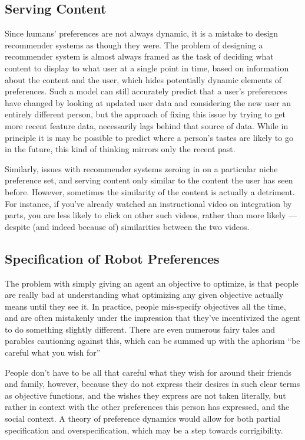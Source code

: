 \documentclass{article}
\begin{document}
	
	\subsection{Serving Content}
	Since humans' preferences are not always dynamic, it is a mistake to design recommender systems as though they were. The problem of designing a recommender system is almost always framed as the task of deciding what content to display to what user at a single point in time, based on information about the content and the user, which hides potentially dynamic elements of preferences. Such a model can still accurately predict that a user's preferences have changed by looking at updated user data and considering the new user an entirely different person, but the approach of fixing this issue by trying to get more recent feature data, necessarily lags behind that source of data. While in principle it is may be possible to predict where a person's tastes are likely to go in the future, this kind of thinking mirrors only the recent past.
	
	Similarly, issues with recommender systems zeroing in on a particular niche preference set, and serving content only similar to the content the user has seen before. However, sometimes the similarity of the content is actually a detriment. For instance, if you've already watched an instructional video on integration by parts, you are less likely to click on other such videos, rather than more likely --- despite (and indeed because of) similarities between the two videos.
	


	

	
	\subsection{Specification of Robot Preferences}
	The problem with simply giving an agent an objective to optimize, is that people are really bad at understanding what optimizing any given objective actually means until they see it. In practice, people mis-specify objectives all the time, and are often mistakenly under the impression that they've incentivized the agent to do something slightly different. There are even numerous fairy tales and parables cautioning against this, which can be summed up with the aphorism ``be careful what you wish for''
	
	People don't have to be all that careful what they wish for around their friends and family, however, because they do not express their desires in such clear terms as objective functions, and the wishes they express are not taken literally, but rather in context with the other preferences this person has expressed, and the social context. A theory of preference dynamics would allow for both partial specification and overspecification, which may be a step towards corrigibility.
	
\end{document}
